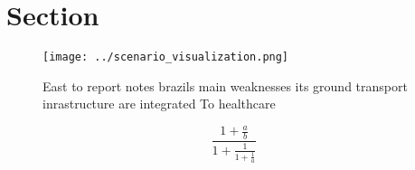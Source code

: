 \documentclass[a4paper]{article}
\begin{document}
\section{Section}

\begin{figure}
\centering
\texttt{[image: ../scenario\_visualization.png]}
\caption{East to report notes brazils main weaknesses its ground transport inrastructure are integrated To healthcare 
}
\end{figure}
 
\[ \frac{1+\frac{a}{b}}{1+\frac{1}{1+\frac{1}{a}}} \]
\end{document}
